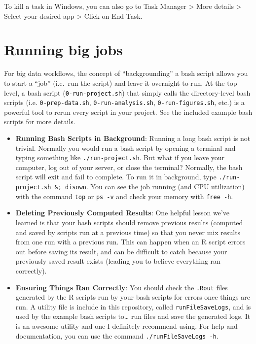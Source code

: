 \documentclass[]{book}
\begin{document}
To kill a task in Windows, you can also go to Task Manager \textgreater{} More details \textgreater{} Select your desired app \textgreater{} Click on End Task.

\hypertarget{running-big-jobs}{%
\section{Running big jobs}\label{running-big-jobs}}

For big data workflows, the concept of ``backgrounding'' a bash script allows you to start a ``job'' (i.e.~run the script) and leave it overnight to run. At the top level, a bash script (\texttt{0-run-project.sh}) that simply calls the directory-level bash scripts (i.e. \texttt{0-prep-data.sh}, \texttt{0-run-analysis.sh}, \texttt{0-run-figures.sh}, etc.) is a powerful tool to rerun every script in your project. See the included example bash scripts for more details.

\begin{itemize}
\item
  \textbf{Running Bash Scripts in Background}: Running a long bash script is not trivial. Normally you would run a bash script by opening a terminal and typing something like \texttt{./run-project.sh}. But what if you leave your computer, log out of your server, or close the terminal? Normally, the bash script will exit and fail to complete. To run it in background, type \texttt{./run-project.sh\ \&;\ disown}. You can see the job running (and CPU utilization) with the command \texttt{top} or \texttt{ps\ -v} and check your memory with \texttt{free\ -h}.
\item
  \textbf{Deleting Previously Computed Results}: One helpful lesson we've learned is that your bash scripts should remove previous results (computed and saved by scripts run at a previous time) so that you never mix results from one run with a previous run. This can happen when an R script errors out before saving its result, and can be difficult to catch because your previously saved result exists (leading you to believe everything ran correctly).
\item
  \textbf{Ensuring Things Ran Correctly}: You should check the \texttt{.Rout} files generated by the R scripts run by your bash scripts for errors once things are run. A utility file is include in this repository, called \texttt{runFileSaveLogs}, and is used by the example bash scripts to\ldots{} run files and save the generated logs. It is an awesome utility and one I definitely recommend using. For help and documentation, you can use the command \texttt{./runFileSaveLogs\ -h}.
\end{itemize}
\end{document}
